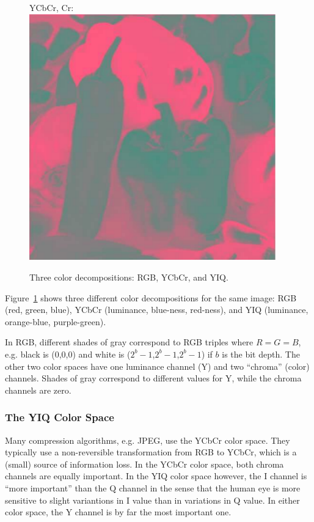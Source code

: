 \documentclass[a4paper,USenglish]{lipics}
\begin{document}
\begin{figure}
\begin{minipage}[b]{0.33\textwidth}
\end{minipage}%
\begin{minipage}[b]{0.33\textwidth}
YCbCr, Cr:\\
\includegraphics[width=0.95\textwidth]{images/ycbcrCb2}
\end{minipage}%

\caption{Three color decompositions: RGB, YCbCr, and YIQ.}
\label{fig:colorspaces}
\end{figure}

Figure~\ref{fig:colorspaces} shows three different color decompositions for the
same image: RGB (red, green, blue), YCbCr (luminance, blue-ness, red-ness),
and YIQ (luminance, orange-blue, purple-green).

In RGB, different shades of gray correspond to RGB triples where $R=G=B$,
e.g. black is (0,0,0) and white is ($2^b-1$,$2^b-1$,$2^b-1$) if $b$ is the bit depth.
The other two color spaces have one luminance channel (Y) and two ``chroma'' (color) channels.
Shades of gray correspond to different values for Y, while the chroma channels are zero.

\subsubsection{The YIQ Color Space}

Many compression algorithms, e.g. JPEG, use the YCbCr color space.
They typically use a non-reversible transformation from RGB to YCbCr, which is a (small) source
of information loss. In the YCbCr color space, both chroma channels are equally important.
In the YIQ color space however, the I channel is ``more important'' than the Q channel in the
sense that the human eye is more sensitive to slight variantions in I value than in variations
in Q value. In either color space, the Y channel is by far the most important one.
\end{document}
